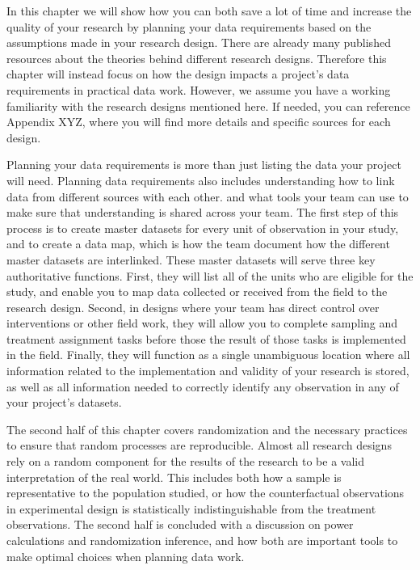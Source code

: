
\begin{fullwidth}

In this chapter we will show how you can both save a lot of time
and increase the quality of your research by planning your data requirements
based on the assumptions made in your research design.
There are already many published resources about 
the theories behind different research designs.
Therefore this chapter will instead focus on how the design 
impacts a project's data requirements in practical data work.
However, we assume you have a working familiarity
with the research designs mentioned here.
If needed, you can reference Appendix XYZ,
where you will find more details and specific sources for each design.

Planning your data requirements is more than just listing the data your project will need. 
Planning data requirements also includes understanding how to link data from different sources with each other.
and what tools your team can use to make sure that understanding is shared across your team.
The first step of this process is to create master datasets 
for every unit of observation in your study,
and to create a data map, 
which is how the team document how the different master datasets are interlinked.
These master datasets will serve three key authoritative functions.
First, they will list all of the units who are eligible for the study,
and enable you to map data collected or received from the field to the research design.
Second, in designs where your team has direct control over interventions or other field work,
they will allow you to complete sampling and treatment assignment tasks
before those the result of those tasks is implemented in the field.
Finally, they will function as a single unambiguous location where all information 
related to the implementation and validity of your research is stored,
as well as all information needed to correctly identify any observation in any of your project's datasets.

The second half of this chapter covers randomization
and the necessary practices to ensure that random processes are reproducible.
Almost all research designs rely on a random component 
for the results of the research to be a valid interpretation of the real world.
This includes both how a sample is representative to the population studied,
or how the counterfactual observations in experimental design is statistically indistinguishable
from the treatment observations.
The second half is concluded with a discussion on power calculations and randomization inference,
and how both are important tools to make optimal choices when planning data work.


\end{fullwidth}

